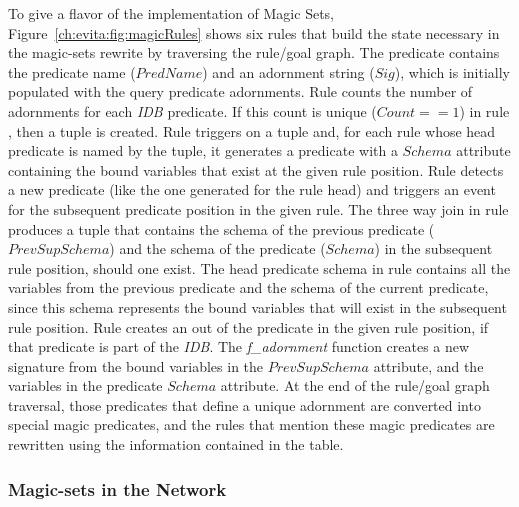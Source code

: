 To give a flavor of the \OVERLOG implementation of Magic Sets,
Figure~\ref{ch:evita:fig:magicRules} shows six rules that build the state
necessary in the magic-sets rewrite by traversing the rule/goal graph.  The
 predicate contains the predicate name ($PredName$) and an
adornment string ($Sig$), which is initially populated with the query predicate
adornments.  Rule  counts the number of adornments for each {\em IDB}
predicate.  If this count is unique ($Count == 1$) in rule , then a
 tuple is created.  Rule  triggers on a 
tuple and, for each rule whose head predicate is named by the 
tuple, it generates a  predicate with a $Schema$ attribute containing
the bound variables that exist at the given rule position.  Rule 
detects a new  predicate (like the one generated for the rule head) and
triggers an event for the subsequent  predicate position in the given
rule.  The three way join in rule  produces a tuple that contains the
schema of the previous  predicate ($PrevSupSchema$) and the schema of
the predicate ($Schema$) in the subsequent rule position, should one exist.
The head  predicate schema in rule  contains all the variables
from the previous  predicate and the schema of the current predicate,
since this schema represents the bound variables that will exist in the
subsequent rule position.  Rule  creates an  out of the
predicate in the given rule position, if that predicate is part of the {\em
IDB}.  The {\em f\_adornment} function creates a new signature from the bound
variables in the $PrevSupSchema$ attribute, and the variables in the predicate
$Schema$ attribute.  At the end of the rule/goal graph traversal, those
predicates that define a unique adornment are converted into special magic
predicates, and the rules that mention these magic predicates are rewritten
using the information contained in the  table.

\subsubsection{Magic-sets in the Network}

